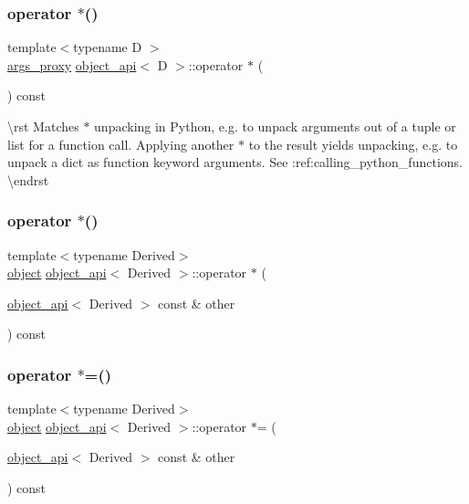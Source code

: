 \subsubsection{\texorpdfstring{operator $\ast$()}{operator *()}\hspace{0.1cm}{\footnotesize\ttfamily [1/2]}}
{\footnotesize\ttfamily template$<$typename D $>$ \\
\mbox{\hyperlink{classargs__proxy}{args\+\_\+proxy}} \mbox{\hyperlink{classobject__api}{object\+\_\+api}}$<$ D $>$\+::operator $\ast$ (\begin{DoxyParamCaption}{ }\end{DoxyParamCaption}) const}

\textbackslash{}rst Matches $\ast$ unpacking in Python, e.\+g. to unpack arguments out of a {\ttfamily tuple} or {\ttfamily list} for a function call. Applying another $\ast$ to the result yields unpacking, e.\+g. to unpack a dict as function keyword arguments. See \+:ref\+:{\ttfamily calling\+\_\+python\+\_\+functions}. \textbackslash{}endrst \mbox{\label{classobject__api_a0e63380430d2b2fcdb77c0231222956b}} 
\subsubsection{\texorpdfstring{operator $\ast$()}{operator *()}\hspace{0.1cm}{\footnotesize\ttfamily [2/2]}}
{\footnotesize\ttfamily template$<$typename Derived$>$ \\
\mbox{\hyperlink{classobject}{object}} \mbox{\hyperlink{classobject__api}{object\+\_\+api}}$<$ Derived $>$\+::operator $\ast$ (\begin{DoxyParamCaption}\item[{\mbox{\hyperlink{classobject__api}{object\+\_\+api}}$<$ Derived $>$ const \&}]{other }\end{DoxyParamCaption}) const}

\mbox{\label{classobject__api_a584e8f4f4921f719da40236708cbfcd3}} 
\subsubsection{\texorpdfstring{operator $\ast$=()}{operator *=()}}
{\footnotesize\ttfamily template$<$typename Derived$>$ \\
\mbox{\hyperlink{classobject}{object}} \mbox{\hyperlink{classobject__api}{object\+\_\+api}}$<$ Derived $>$\+::operator $\ast$= (\begin{DoxyParamCaption}\item[{\mbox{\hyperlink{classobject__api}{object\+\_\+api}}$<$ Derived $>$ const \&}]{other }\end{DoxyParamCaption}) const}


